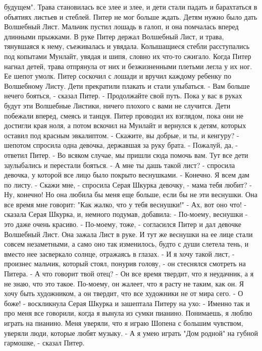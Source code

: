 будущем".
    Трава становилась все злее и злее, и дети стали падать и 
барахтаться в объятиях листьев и стеблей. Питер не мог больше ждать. 
Детям нужно было дать Волшебный Лист. Мальчик пустил лошадь в галоп, и 
она помчалась вперед длинными прыжками. В руке Питер держал Волшебный 
Лист, и трава, тянувшаяся к нему, съеживалась и увядала. Колышащиеся 
стебли расступались под копытами Мунлайт, увядая и шипя, словно их 
что-то сжигало.
    Когда Питер нагнал детей, трава отпрянула от них и безжизненными 
плетьми легла у их ног. Ее шепот умолк.
    Питер соскочил с лошади и вручил каждому ребенку по Волшебному 
Листу. Дети прекратили плакать и стали улыбаться.
    - Вам больше нечего бояться, - сказал Питер. - Продолжайте свой 
путь. Пока у вас в руках будут эти Волшебные Листики, ничего плохого с 
вами не случится.
    Дети побежали вперед, смеясь и танцуя. Питер проводил их взглядом, 
пока они не достигли края ноля, а потом вскочил на Мунлайт и вернулся 
к детям, которых оставил под красным эвкалиптом.
    - Скажите, вы добрые, и ты, и кенгуру? - шепотом спросила одна 
девочка, державшая за руку брата.
    - Пожалуй, да, - ответил Питер. - Во всяком случае, мы пришли сюда 
помочь вам.
    Тут все дети заулыбались и перестали бояться.
    - А мне ты дашь такой лист? - спросила девочка, у которой все лицо 
было покрыто веснушками.
    - Конечно. Я всем дам по листу.
    - Скажи мне, - спросила Серая Шкурка девочку, - мама тебя любит?
    - Ну, конечно! Но она любила бы меня еще больше, если бы не эти 
веснушки. Она все время мне говорит: "Как жалко, что у тебя веснушки!"
    - Ах, вот оно что! - сказала Серая Шкурка, и, немного подумав, 
добавила: - По-моему, веснушки - это даже очень красиво.
    - По-моему, тоже, - согласился Питер и дал девочке Волшебный Лист.
    Она зажала Лист в руке. И тут же веснушки на ее лице стали совсем 
незаметными, а само оно так изменилось, будто с души слетела тень, и 
вместо нее засверкало солнце, отражаясь в глазах.
    - И я хочу такой лист, - произнес мальчик, который стоял, понурив 
голову, - он стеснялся смотреть на Питера.
    - А что говорит твой отец?
    - Он все время твердит, что я неудачник, а я не знаю, что это 
такое. По-моему, он жалеет, что я расту не таким, как он. Я хочу быть 
художником, а он твердит, что все художники не от мира сего.
    - О боже! - воскликнула Серая Шкурка и зашептала Питеру на ухо: - 
Именно так и про меня все говорили, когда я вынула из сумки пианино. 
Понимаешь, я люблю играть на пианино. Меня уверяли, что я играю Шопена 
с большим чувством, уверяли люди, которые любят музыку.
    - А я умею играть "Дом родной" на губной гармошке, - сказал Питер. 
